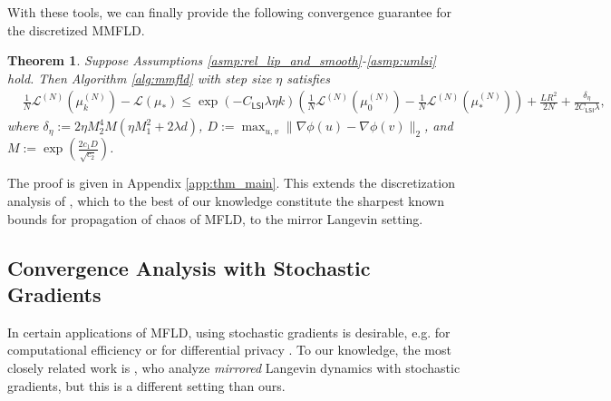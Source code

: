 \documentclass{article}
\newtheorem{theorem}{Theorem}[section]
\newcommand{\CLSI}[0]{C_{\mathsf{LSI}}}
\begin{document}
With these tools, we can finally provide the following convergence guarantee for the discretized MMFLD.
\begin{theorem}\label{thm:main}
    Suppose Assumptions \ref{asmp:rel_lip_and_smooth}-\ref{asmp:umlsi} hold. Then Algorithm \ref{alg:mmfld} with step size $\eta$ satisfies \begin{align*}
    &\frac{1}{N}\mathcal{L}^{(N)}(\mu_k^{(N)}) - \mathcal{L}(\mu_*)\le \exp\left(-\CLSI \lambda\eta k\right)\left(\frac{1}{N}\mathcal{L}^{(N)}(\mu_0^{(N)}) - \frac{1}{N}\mathcal{L}^{(N)}(\mu_*^{(N)})\right) + \frac{LR^2}{2N} + \frac{\delta_\eta}{2\CLSI\lambda},    
    \end{align*}
    where $\delta_\eta := 2\eta M_2^4M(\eta M_1^2 + 2\lambda d)$, $D:= \max_{u,v}\|\nabla\phi(u)-\nabla\phi(v)\|_2$, and $M := \exp\left(\frac{2c_1D}{\sqrt{c_2}}\right)$.
\end{theorem}
The proof is given in Appendix \ref{app:thm_main}. This extends the discretization analysis of \citet{nitanda2024improved,nitanda2025}, which to the best of our knowledge constitute the sharpest known bounds for propagation of chaos of MFLD, to the mirror Langevin setting.

\subsection{Convergence Analysis with Stochastic Gradients}
In certain applications of MFLD, using stochastic gradients is desirable, e.g. for computational efficiency or for differential privacy \cite{gu2025private}. To our knowledge, the most closely related work is \cite{hsieh2018}, who analyze \emph{mirrored} Langevin dynamics with stochastic gradients, but this is a different setting than ours. 
\end{document}
